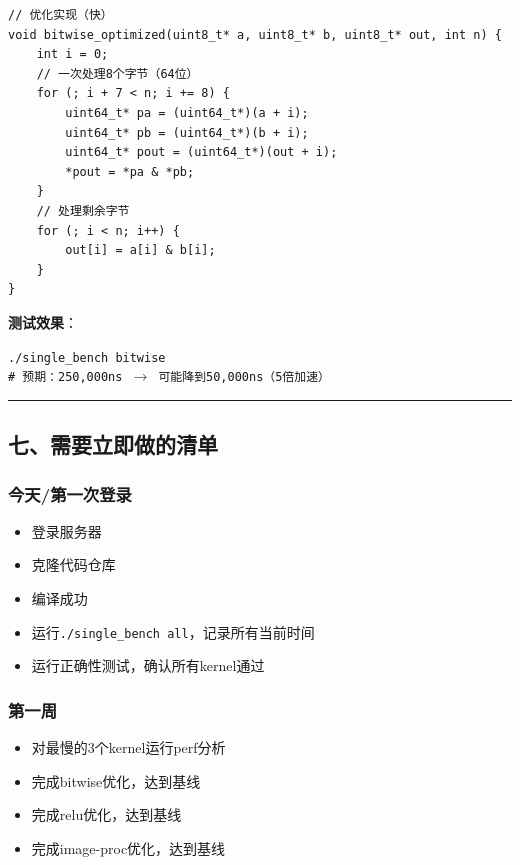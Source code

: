 \documentclass[11pt, a4paper]{article}
\begin{document}
\begin{aibox}
\begin{tcolorbox}[colback=white,colframe=gray!50!white,boxrule=0.5pt,arc=2pt,left=5pt,right=5pt,top=5pt,bottom=5pt]
\begin{verbatim}
// 优化实现（快）
void bitwise_optimized(uint8_t* a, uint8_t* b, uint8_t* out, int n) {
    int i = 0;
    // 一次处理8个字节（64位）
    for (; i + 7 < n; i += 8) {
        uint64_t* pa = (uint64_t*)(a + i);
        uint64_t* pb = (uint64_t*)(b + i);
        uint64_t* pout = (uint64_t*)(out + i);
        *pout = *pa & *pb;
    }
    // 处理剩余字节
    for (; i < n; i++) {
        out[i] = a[i] & b[i];
    }
}
\end{verbatim}
\end{tcolorbox}

\textbf{测试效果}：
\begin{tcolorbox}[colback=white,colframe=gray!50!white,boxrule=0.5pt,arc=2pt,left=5pt,right=5pt,top=5pt,bottom=5pt]
\texttt{./single\_bench bitwise}\\
\texttt{\# 预期：250,000ns $\rightarrow$ 可能降到50,000ns（5倍加速）}
\end{tcolorbox}

\begin{center}\rule{\textwidth}{0.4pt}\end{center}

\subsection*{七、需要立即做的清单}

\subsubsection*{今天/第一次登录}
\begin{itemize}
    \item[$\square$] 登录服务器
    \item[$\square$] 克隆代码仓库
    \item[$\square$] 编译成功
    \item[$\square$] 运行\texttt{./single\_bench all}，记录所有当前时间
    \item[$\square$] 运行正确性测试，确认所有kernel通过
\end{itemize}

\subsubsection*{第一周}
\begin{itemize}
    \item[$\square$] 对最慢的3个kernel运行perf分析
    \item[$\square$] 完成bitwise优化，达到基线
    \item[$\square$] 完成relu优化，达到基线
    \item[$\square$] 完成image-proc优化，达到基线
\end{itemize}


\end{aibox}
\end{document}
